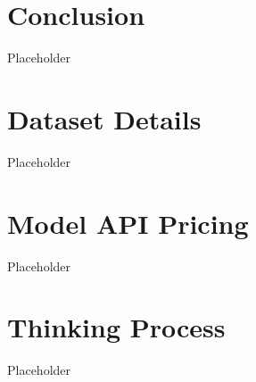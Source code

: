 \documentclass[sigconf, review]{acmart}
\begin{document}

\section{Conclusion}
Placeholder






\appendix

\section{Dataset Details}
\label{app:dataset-details}

Placeholder


\section{Model API Pricing}
\label{app:api-pricing}

Placeholder

\section{Thinking Process}
\label{app:thinking-process}

Placeholder
\end{document}
